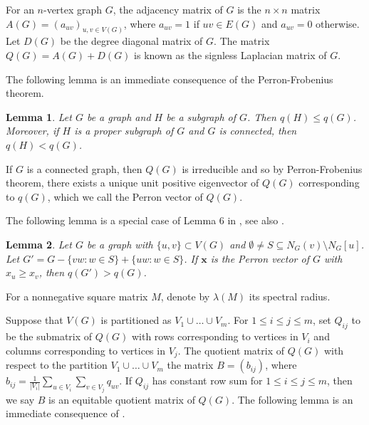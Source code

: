 \documentclass[12pt]{article}
\newtheorem {lemma}{Lemma}[section]
\begin{document}
For an $n$-vertex graph $G$, the adjacency matrix of $G$ is the $n\times n$ matrix
$A(G)=(a_{uv})_{u,v\in V(G)}$, where $a_{uv}=1$ if $uv\in E(G)$ and $a_{uv}=0$ otherwise.
Let $D(G)$ be the degree diagonal matrix of $G$.
The matrix $Q(G)=A(G)+D(G)$ is known as the signless Laplacian matrix of $G$.

The following lemma is an immediate consequence of the Perron-Frobenius theorem.

\begin{lemma}\label{addedges}
Let $G$ be a graph and $H$ be a subgraph of $G$. Then $q(H)\le q(G)$. Moreover, if $H$ is a proper subgraph of $G$ and $G$ is connected,  then $q(H)<q(G)$.
\end{lemma}


If $G$ is a connected graph, then $Q(G)$ is irreducible and so by Perron-Frobenius theorem, there exists a unique unit positive eigenvector of $Q(G)$ corresponding to $q(G)$, which we call the Perron vector of $Q(G)$.

The following lemma is a special case of Lemma 6 in \cite{NR}, see also \cite{Row,SLB}.

\begin{lemma} \label{perron}
Let $G$ be a graph with $\{u,v\}\subset V(G)$ and $\emptyset\ne S\subseteq N_G(v)\setminus N_G[u]$. Let
$G'=G-\{vw: w\in S\}+\{uw: w\in S\}$. If $\mathbf{x}$ is the Perron vector of $G$ with $x_u\ge x_v$, then $q(G')>q(G)$.
\end{lemma}






For a nonnegative square matrix $M$, denote by $\lambda(M)$ its spectral radius.

Suppose that $V(G)$ is partitioned as $V_1\cup \dots\cup V_m$. For $1\le i\le j\le m$, set $Q_{ij}$ to be the submatrix of $Q(G)$ with rows corresponding to vertices in $V_i$ and columns corresponding to vertices in $V_j$. The quotient matrix of $Q(G)$ with respect to the partition $V_1\cup \dots \cup V_m$ the matrix  $B=(b_{ij})$, where $b_{ij}=\frac{1}{|V_i|}\sum_{u\in V_i}\sum_{v\in V_j}q_{uv}$. If $Q_{ij}$ has constant row sum for  $1\le i\le j\le m$, then we say $B$ is an equitable quotient matrix of $Q(G)$.
The following lemma is an immediate consequence of \cite[Lemma 2.3.1]{BH}.
\end{document}
